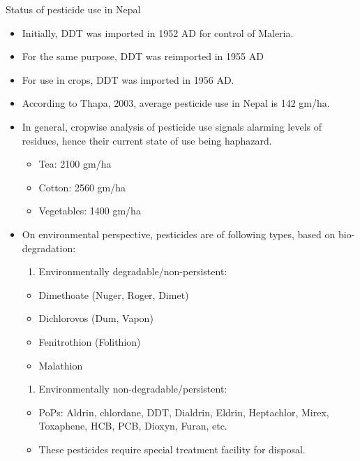 \documentclass[]{book}
\providecommand{\tightlist}{%
  \setlength{\itemsep}{0pt}\setlength{\parskip}{0pt}}
\begin{document}
Status of pesticide use in Nepal

\begin{itemize}
\tightlist
\item
  Initially, DDT was imported in 1952 AD for control of Maleria.
\item
  For the same purpose, DDT was reimported in 1955 AD
\item
  For use in crops, DDT was imported in 1956 AD.
\item
  According to Thapa, 2003, average pesticide use in Nepal is 142 gm/ha.
\item
  In general, cropwise analysis of pesticide use signals alarming levels of residues, hence their current state of use being haphazard.

  \begin{itemize}
  \tightlist
  \item
    Tea: 2100 gm/ha
  \item
    Cotton: 2560 gm/ha
  \item
    Vegetables: 1400 gm/ha
  \end{itemize}
\item
  On environmental perspective, pesticides are of following types, based on bio-degradation:

  \begin{enumerate}
  \def\labelenumi{\arabic{enumi}.}
  \tightlist
  \item
    Environmentally degradable/non-persistent:
  \end{enumerate}

  \begin{itemize}
  \tightlist
  \item
    Dimethoate (Nuger, Roger, Dimet)
  \item
    Dichlorovos (Dum, Vapon)
  \item
    Fenitrothion (Folithion)
  \item
    Malathion
  \end{itemize}

  \begin{enumerate}
  \def\labelenumi{\arabic{enumi}.}
  \setcounter{enumi}{1}
  \tightlist
  \item
    Environmentally non-degradable/persistent:
  \end{enumerate}

  \begin{itemize}
  \tightlist
  \item
    PoPs: Aldrin, chlordane, DDT, Dialdrin, Eldrin, Heptachlor, Mirex, Toxaphene, HCB, PCB, Dioxyn, Furan, etc.
  \item
    These pesticides require special treatment facility for disposal.
  \end{itemize}
\end{itemize}
\end{document}
